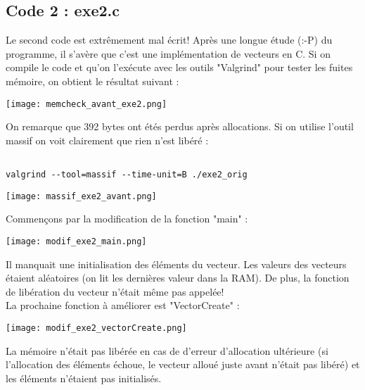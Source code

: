 \pagebreak
\subsection{Code 2 : exe2.c}
Le second code est extrêmement mal écrit! Après une longue étude (:-P) du programme, il s'avère que c'est une implémentation de vecteurs en C. Si on compile le code et qu'on l'exécute avec les outils "Valgrind" pour tester les fuites mémoire, on obtient le résultat suivant :
\begin{center} 
\hspace{15cm}
\texttt{[image: memcheck\_avant\_exe2.png]}
\end{center}
\vspace{0.5cm}

On remarque que 392 bytes ont étés perdus après allocations. Si on utilise l'outil massif on voit clairement que rien n'est libéré :
\begin{lstlisting}[frame=single,style=Console]  % Start your code-block

valgrind --tool=massif --time-unit=B ./exe2_orig
\end{lstlisting}
\begin{center} 
\hspace{15cm}
\texttt{[image: massif\_exe2\_avant.png]}
\end{center}
\vspace{0.5cm}
\pagebreak





Commençons par la modification de la fonction "main" :
\begin{center} 
\hspace{15cm}
\texttt{[image: modif\_exe2\_main.png]}
\end{center}
\vspace{0.5cm}

Il manquait une initialisation des éléments du vecteur. Les valeurs des vecteurs étaient aléatoires (on lit les dernières valeur dans la RAM). De plus, la fonction de libération du vecteur n'était même pas appelée!\\

La prochaine fonction à améliorer est "VectorCreate" :
\begin{center} 
\hspace{15cm}
\texttt{[image: modif\_exe2\_vectorCreate.png]}
\end{center}
\vspace{0.5cm}
La mémoire n'était pas libérée en cas de d'erreur d'allocation ultérieure (si l'allocation des éléments échoue, le vecteur alloué juste avant n'était pas libéré) et les éléments n'étaient pas initialisés.
\pagebreak

